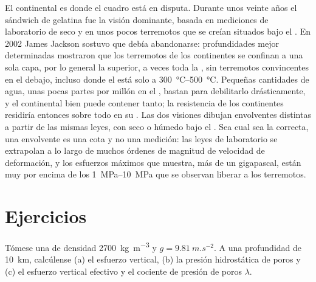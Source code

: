 El  continental es donde el cuadro está en disputa. Durante unos veinte años el sándwich de gelatina fue la visión dominante, basada en mediciones de
laboratorio de  seco y en unos pocos terremotos que se creían situados bajo el . En 2002 James Jackson sostuvo que debía abandonarse: profundidades
mejor determinadas mostraron que los terremotos de los continentes se confinan a una sola capa, por lo general la  superior, a veces toda la , sin
terremotos convincentes en el  debajo, incluso donde el  está solo a \qtyrange{300}{500}{\degreeCelsius}. Pequeñas cantidades de agua, unas pocas
partes por millón en el , bastan para debilitarlo drásticamente, y el  continental bien puede contener tanto; la resistencia de los continentes
residiría entonces sobre todo en su . Las dos visiones dibujan envolventes distintas a partir de las mismas leyes, con  seco o húmedo bajo el .
Sea cual sea la correcta, una envolvente es una cota y no una medición: las leyes de laboratorio se extrapolan a lo largo de muchos órdenes de magnitud de velocidad
de deformación, y los esfuerzos máximos que muestra, más de un gigapascal, están muy por encima de los \qtyrange{1}{10}{MPa} que se observan liberar a los terremotos.

\section{Ejercicios}

\begin{exercise}[$\star$]\label{exo:b1:stress-strain-rheology:1}
Tómese una  de densidad \qty{2700}{kg.m^{-3}} y $g = \qty{9.81}{m.s^{-2}}$. A una profundidad de \qty{10}{km},
calcúlense (a) el esfuerzo vertical, (b) la presión hidrostática de poros y (c) el esfuerzo vertical efectivo y el cociente
de presión de poros $\lambda$.
\end{exercise}

